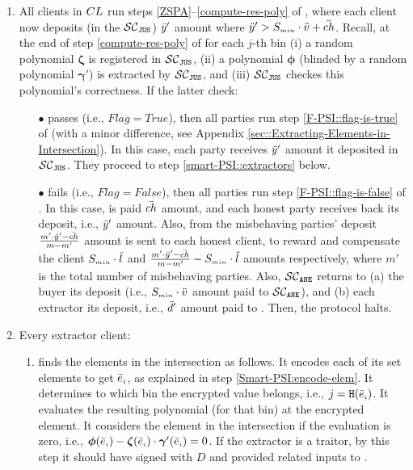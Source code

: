 \begin{enumerate}[leftmargin=4mm]
\item\label{e-psi::invoke-remainer-F-PSI} All clients in ${CL}$   run steps \ref{ZSPA}--\ref{compute-res-poly} of \fpsi, where each client now deposits (in the $\mathcal{SC}_{\mathtt{JUS}}$) $\ddot{y}'$ amount where $\ddot{y}'>S_{\scriptscriptstyle min}\cdot \ddot{v}+{\ddot{ch}}$. Recall, at the end of step \ref{compute-res-poly}  of \fpsi for each $j$-th bin (i) a random polynomial $\bm\zeta$ is registered in $\mathcal{SC}_{\mathtt{JUS}}$, (ii) a polynomial $\bm\phi$ (blinded by a random polynomial $\bm\gamma'$) is extracted by $\mathcal{SC}_{\mathtt{JUS}}$, and (iii) $\mathcal{SC}_{\mathtt{JUS}}$  checkes this polynomial's  correctness. If the latter check:

\begin{itemize}
\item[$\bullet$] passes (i.e., $Flag=True$), then all parties run step \ref{F-PSI::flag-is-true} of \fpsi (with a minor difference, see Appendix \ref{sec::Extracting-Elements-in-Intersection}).  In this case, each party receives $\ddot{y}'$ amount it deposited in $\mathcal{SC}_{\mathtt{JUS}}$. They proceed to step \ref{smart-PSI::extractors} below.

\item[$\bullet$]  fails (i.e., $Flag=False$), then all parties run step \ref{F-PSI::flag-is-false}  of \fpsi. In this case,
 \aud is paid $\ddot{ch}$ amount, and each honest party receives back its deposit, i.e., $\ddot{y}'$ amount. Also,  from the misbehaving parties' deposit  $\frac{m'\cdot \ddot{y}'-\ddot{ch}}{m-m'}$ amount is sent to each honest client,  to reward and compensate the client $S_{\scriptscriptstyle min}\cdot \ddot{l}$ and $\frac{m'\cdot \ddot{y}'-\ddot{ch}}{m-m'}- S_{\scriptscriptstyle min}\cdot \ddot{l}$ amounts respectively, where $m'$ is the total number of misbehaving parties.  Also, $\mathcal{SC}_{\mathtt{ANE}}$ returns to (a) the buyer its deposit (i.e., $S_{\scriptscriptstyle min}\cdot \ddot{v}$ amount paid to $\mathcal{SC}_{\mathtt{ANE}}$), and (b) each extractor its deposit, i.e., $\ddot{d}'$ amount paid to \SCpc. Then, the protocol halts. 
\end{itemize}

\item\label{smart-PSI::extractors} Every extractor client: 
\begin{enumerate}

\item finds the elements in the intersection as follows. It encodes each of its set elements to get $\bar e_{\scriptscriptstyle i}$, as explained in step \ref{Smart-PSI:encode-elem}.  
%
It determines to which bin the encrypted value belongs, i.e., ${ {  {j}}}=\mathtt{H}( \bar{e}_{\scriptscriptstyle i})$. It evaluates the resulting polynomial (for that bin) at the encrypted element. It considers the element in the intersection if the evaluation is zero, i.e., $\bm\phi( \bar{e}_{\scriptscriptstyle i})-\bm\zeta( \bar{e}_{\scriptscriptstyle i})\cdot \bm\gamma'( \bar{e}_{\scriptscriptstyle i})=0$. If the extractor is a traitor, by this step it should have signed \SCtc with $ { D}$ and provided related inputs to \SCtc. 


\end{enumerate}
\end{enumerate}
